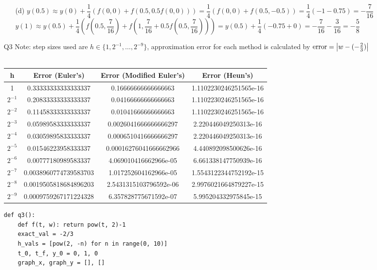 \documentclass{article}
\begin{document}
\begin{itemize}
\begin{itemize}
              \item [(d)] $y(0.5)\approx y(0)+\dfrac{1}{4}(f(0,0)+f(0.5, 0.5f(0, 0)))=\dfrac{1}{4}(f(0,0)+f(0.5, -0.5))=\dfrac{1}{4}(-1-0.75)=-\dfrac{7}{16}$\\$y(1)\approx y(0.5)+\dfrac{1}{4}(f(0.5,\dfrac{7}{16})+f(1,\dfrac{7}{16}+0.5f(0.5,\dfrac{7}{16})))=y(0.5)+\dfrac{1}{4}(-0.75+0)=-\dfrac{7}{16}-\dfrac{3}{16}=\boxed{-\dfrac{5}{8}}$
          \end{itemize}
    \item [Q3] Note: step sizes used are $h\in\{1,2^{-1},\ldots,2^{-9}\}$, approximation error for each method is calculated by $\text{error}=\abs{w-(-\frac{2}{3})}$\\\\
          \begin{tabular}{|c|c|c|c|}
              \hline
              h        & Error (Euler's)       & Error (Modified Euler's) & Error (Heun's)         \\
              \hline
              1        & 0.33333333333333337   & 0.16666666666666663      & 1.1102230246251565e-16 \\
              \hline
              $2^{-1}$ & 0.20833333333333337   & 0.04166666666666663      & 1.1102230246251565e-16 \\
              \hline
              $2^{-2}$ & 0.11458333333333337   & 0.01041666666666663      & 1.1102230246251565e-16 \\
              \hline
              $2^{-3}$ & 0.05989583333333337   & 0.0026041666666666297    & 2.220446049250313e-16  \\
              \hline
              $2^{-4}$ & 0.03059895833333337   & 0.0006510416666666297    & 2.220446049250313e-16  \\
              \hline
              $2^{-5}$ & 0.01546223958333337   & 0.00016276041666662966   & 4.440892098500626e-16  \\
              \hline
              $2^{-6}$ & 0.00777180989583337   & 4.069010416662966e-05    & 6.661338147750939e-16  \\
              \hline
              $2^{-7}$ & 0.0038960774739583703 & 1.017252604162966e-05    & 1.5543122344752192e-15 \\
              \hline
              $2^{-8}$ & 0.0019505818684896203 & 2.5431315103796592e-06   & 2.9976021664879227e-15 \\
              \hline
              $2^{-9}$ & 0.0009759267171224328 & 6.357828775671592e-07    & 5.995204332975845e-15  \\
              \hline
          \end{tabular}
          \begin{verbatim}
def q3():
    def f(t, w): return pow(t, 2)-1
    exact_val = -2/3
    h_vals = [pow(2, -n) for n in range(0, 10)]
    t_0, t_f, y_0 = 0, 1, 0
    graph_x, graph_y = [], []


\end{verbatim}
\end{itemize}
\end{document}
